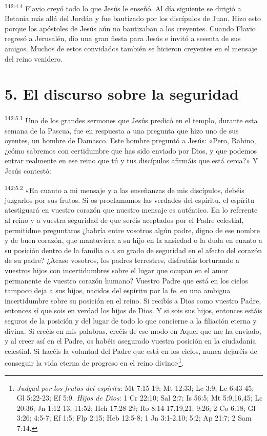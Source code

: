 \par 
\textsuperscript{142:4.4} Flavio creyó todo lo que Jesús le enseñó. Al día siguiente se dirigió a Betania más allá del Jordán y fue bautizado por los discípulos de Juan. Hizo esto porque los apóstoles de Jesús aún no bautizaban a los creyentes. Cuando Flavio regresó a Jerusalén, dio una gran fiesta para Jesús e invitó a sesenta de sus amigos. Muchos de estos convidados también se hicieron creyentes en el mensaje del reino venidero.

\section*{5. El discurso sobre la seguridad}
\par 
\textsuperscript{142:5.1} Uno de los grandes sermones que Jesús predicó en el templo, durante esta semana de la Pascua, fue en respuesta a una pregunta que hizo uno de sus oyentes, un hombre de Damasco. Este hombre preguntó a Jesús: «Pero, Rabino, ¿cómo sabremos con certidumbre que has sido enviado por Dios, y que podemos entrar realmente en ese reino que tú y tus discípulos afirmáis que está cerca?» Y Jesús contestó:

\par 
\textsuperscript{142:5.2} «En cuanto a mi mensaje y a las enseñanzas de mis discípulos, debéis juzgarlos por sus frutos. Si os proclamamos las verdades del espíritu, el espíritu atestiguará en vuestro corazón que nuestro mensaje es auténtico. En lo referente al reino y a vuestra seguridad de que seréis aceptados por el Padre celestial, permitidme preguntaros ¿habría entre vosotros algún padre, digno de ese nombre y de buen corazón, que mantuviera a su hijo en la ansiedad o la duda en cuanto a su posición dentro de la familia o a su grado de seguridad en el afecto del corazón de su padre? ¿Acaso vosotros, los padres terrestres, disfrutáis torturando a vuestros hijos con incertidumbres sobre el lugar que ocupan en el amor permanente de vuestro corazón humano? Vuestro Padre que está en los cielos tampoco deja a sus hijos, nacidos del espíritu por la fe, en una ambigua incertidumbre sobre su posición en el reino. Si recibís a Dios como vuestro Padre, entonces sí que sois en verdad los hijos de Dios. Y si sois sus hijos, entonces estáis seguros de la posición y del lugar de todo lo que concierne a la filiación eterna y divina. Si creéis en mis palabras, creéis de ese modo en Aquel que me ha enviado, y al creer así en el Padre, os habéis asegurado vuestra posición en la ciudadanía celestial. Si hacéis la voluntad del Padre que está en los cielos, nunca dejaréis de conseguir la vida eterna de progreso en el reino divino»\footnote{\textit{Judgad por los frutos del espíritu}: Mt 7:15-19; Mt 12:33; Lc 3:9; Lc 6:43-45; Gl 5:22-23; Ef 5:9. \textit{Hijos de Dios}: 1 Cr 22:10; Sal 2:7; Is 56:5; Mt 5:9,16,45; Lc 20:36; Jn 1:12-13; 11:52; Hch 17:28-29; Ro 8:14-17,19,21; 9:26; 2 Co 6:18; Gl 3:26; 4:5-7; Ef 1:5; Flp 2:15; Heb 12:5-8; 1 Jn 3:1-2,10; 5:2; Ap 21:7; 2 Sam 7:14.}.

